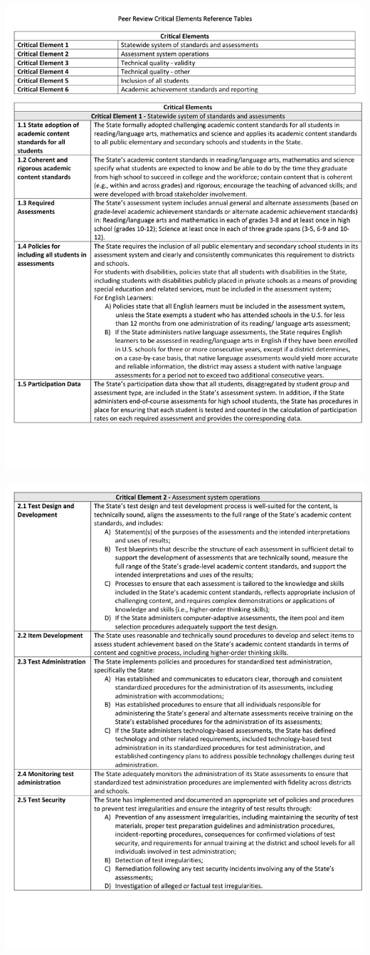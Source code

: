 \documentclass[]{book}
\begin{document}
\includegraphics{figures/peer_rev/PeerReview1.pdf}

\newpage

\includegraphics{figures/peer_rev/PeerReview2.pdf}
\end{document}
